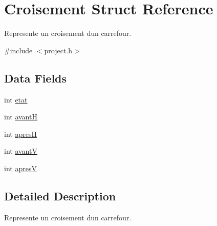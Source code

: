 \hypertarget{struct_croisement}{}\section{Croisement Struct Reference}
\label{struct_croisement}


Represente un croisement d\textquotesingle{}un carrefour.  




{\ttfamily \#include $<$project.\+h$>$}

\subsection*{Data Fields}
\begin{DoxyCompactItemize}
\item 
int \hyperlink{struct_croisement_a593430af208bfef9b3ce7325558b667b}{etat}
\item 
int \hyperlink{struct_croisement_aec0a573c81b0f7b93447e88cb693c578}{avant\+H}
\item 
int \hyperlink{struct_croisement_a92825e65e3dc482ea0749873b2669f85}{apres\+H}
\item 
int \hyperlink{struct_croisement_ab78c7081771d7a1ee85e5adb38c62d3d}{avant\+V}
\item 
int \hyperlink{struct_croisement_aedd3f8edd387efe89a1c6f63a25f066a}{apres\+V}
\end{DoxyCompactItemize}


\subsection{Detailed Description}
Represente un croisement d\textquotesingle{}un carrefour. 

